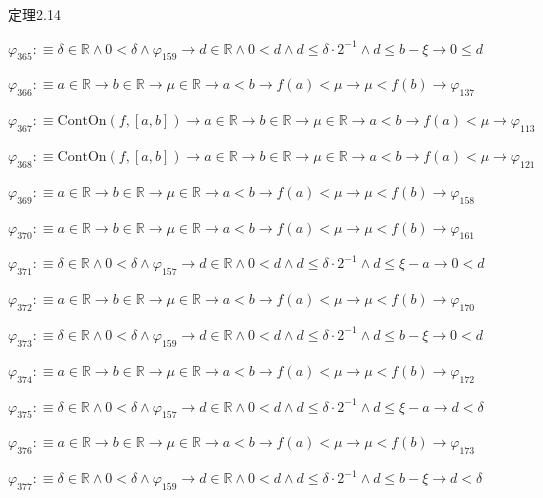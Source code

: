 \begin{fullproof}{定理2.14}
\begin{abbrevlist}
\item $\varphi_{365} :\equiv \delta \in \mathbb{R} \land 0 < \delta \land \varphi_{159} \to d \in \mathbb{R} \land 0 < d \land d \leq \delta \cdot 2^{-1} \land d \leq b - \xi \to 0 \leq d$
\item $\varphi_{366} :\equiv a \in \mathbb{R} \to b \in \mathbb{R} \to \mu \in \mathbb{R} \to a < b \to f(a) < \mu \to \mu < f(b) \to \varphi_{137}$
\item $\varphi_{367} :\equiv \mathrm{ContOn}(f,[a,b]) \to a \in \mathbb{R} \to b \in \mathbb{R} \to \mu \in \mathbb{R} \to a < b \to f(a) < \mu \to \varphi_{113}$
\item $\varphi_{368} :\equiv \mathrm{ContOn}(f,[a,b]) \to a \in \mathbb{R} \to b \in \mathbb{R} \to \mu \in \mathbb{R} \to a < b \to f(a) < \mu \to \varphi_{121}$
\item $\varphi_{369} :\equiv a \in \mathbb{R} \to b \in \mathbb{R} \to \mu \in \mathbb{R} \to a < b \to f(a) < \mu \to \mu < f(b) \to \varphi_{158}$
\item $\varphi_{370} :\equiv a \in \mathbb{R} \to b \in \mathbb{R} \to \mu \in \mathbb{R} \to a < b \to f(a) < \mu \to \mu < f(b) \to \varphi_{161}$
\item $\varphi_{371} :\equiv \delta \in \mathbb{R} \land 0 < \delta \land \varphi_{157} \to d \in \mathbb{R} \land 0 < d \land d \leq \delta \cdot 2^{-1} \land d \leq \xi - a \to 0 < d$
\item $\varphi_{372} :\equiv a \in \mathbb{R} \to b \in \mathbb{R} \to \mu \in \mathbb{R} \to a < b \to f(a) < \mu \to \mu < f(b) \to \varphi_{170}$
\item $\varphi_{373} :\equiv \delta \in \mathbb{R} \land 0 < \delta \land \varphi_{159} \to d \in \mathbb{R} \land 0 < d \land d \leq \delta \cdot 2^{-1} \land d \leq b - \xi \to 0 < d$
\item $\varphi_{374} :\equiv a \in \mathbb{R} \to b \in \mathbb{R} \to \mu \in \mathbb{R} \to a < b \to f(a) < \mu \to \mu < f(b) \to \varphi_{172}$
\item $\varphi_{375} :\equiv \delta \in \mathbb{R} \land 0 < \delta \land \varphi_{157} \to d \in \mathbb{R} \land 0 < d \land d \leq \delta \cdot 2^{-1} \land d \leq \xi - a \to d < \delta$
\item $\varphi_{376} :\equiv a \in \mathbb{R} \to b \in \mathbb{R} \to \mu \in \mathbb{R} \to a < b \to f(a) < \mu \to \mu < f(b) \to \varphi_{173}$
\item $\varphi_{377} :\equiv \delta \in \mathbb{R} \land 0 < \delta \land \varphi_{159} \to d \in \mathbb{R} \land 0 < d \land d \leq \delta \cdot 2^{-1} \land d \leq b - \xi \to d < \delta$

\end{abbrevlist}
\end{fullproof}
